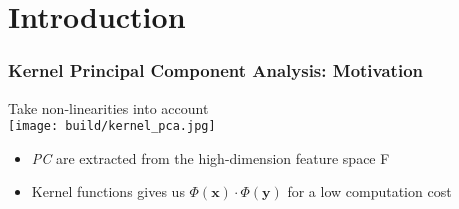 
\section[Introduction]{Introduction} %
%

\begin{frame}
    \frametitle{Kernel Principal Component Analysis: Motivation} %
	Take non-linearities into account\\
	\vspace{0.5cm}
	\texttt{[image: build/kernel\_pca.jpg]}    
	
		\begin{itemize}
		\item \textit{PC} are extracted from the high-dimension feature space F
		\item Kernel functions gives us $\Phi(\textbf{x}) \cdot \Phi(\textbf{y})$ for a low computation cost
	\end{itemize}
   
\end{frame}

%    
